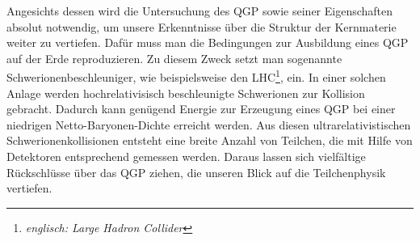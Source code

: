\documentclass[12pt,a4paper]{report}
\begin{document}
Angesichts dessen wird die Untersuchung des QGP sowie seiner Eigenschaften absolut notwendig, um unsere Erkenntnisse über die Struktur der Kernmaterie weiter zu vertiefen. Dafür muss man die Bedingungen zur Ausbildung eines QGP auf der Erde reproduzieren. Zu diesem Zweck setzt man sogenannte Schwerionenbeschleuniger, wie beispielsweise den LHC\footnote{\textit{englisch: Large Hadron Collider}}, ein. In einer solchen Anlage werden hochrelativisisch beschleunigte Schwerionen zur Kollision gebracht. Dadurch kann genügend Energie zur Erzeugung eines QGP bei einer niedrigen Netto-Baryonen-Dichte erreicht werden. Aus diesen ultrarelativistischen Schwerionenkollisionen entsteht eine breite Anzahl von Teilchen, die mit Hilfe von Detektoren entsprechend gemessen werden. Daraus lassen sich vielfältige Rückschlüsse über das QGP ziehen, die unseren Blick auf die Teilchenphysik vertiefen.
\end{document}
